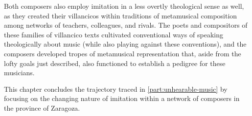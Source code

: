 Both composers also employ imitation in a less overtly theological sense as
well, as they created their villancicos within traditions of metamusical
composition among networks of teachers, colleagues, and rivals. 
The poets and compositors of these families of villancico texts cultivated
conventional ways of speaking theologically about music (while also playing
against these conventions), and the composers developed tropes of metamusical
representation that, aside from the lofty goals just described, also functioned
to establish a pedigree for these musicians.

This chapter concludes the trajectory traced in \cref{part:unhearable-music} by
focusing on the changing nature of imitation within a network of composers in
the province of Zaragoza.
